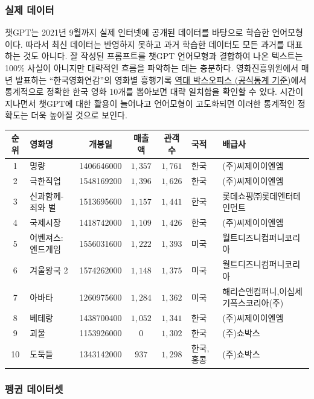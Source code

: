 \documentclass[
  letterpaper,
]{book}
\begin{document}
\hypertarget{uxc2e4uxc81c-uxb370uxc774uxd130}{%
\subsubsection{실제 데이터}\label{uxc2e4uxc81c-uxb370uxc774uxd130}}

챗GPT는 2021년 9월까지 실제 인터넷에 공개된 데이터를 바탕으로 학습한
언어모형이다. 따라서 최신 데이터는 반영하지 못하고 과거 학습한 데이터도
모든 과거를 대표하는 것도 아니다. 잘 작성된 프롬프트를 챗GPT 언어모형과
결합하여 나온 텍스트는 100\% 사실이 아니지만 대략적인 흐름을 파악하는
데는 충분하다. 영화진흥위원에서 매년 발표하는 ``한국영화연감''의 영화별
흥행기록
\href{https://www.kobis.or.kr/kobis/business/stat/offc/findFormerBoxOfficeList.do}{역대
박스오피스 (공식통계 기준)}에서 통계적으로 정확한 한국 영화 10개를
뽑아보면 대략 일치함을 확인할 수 있다. 시간이 지나면서 챗GPT에 대한
활용이 늘어나고 언어모형이 고도화되면 이러한 통계적인 정확도는 더욱
높아질 것으로 보인다.

\begin{longtable*}{clcccll}
\toprule
순위 & 영화명 & 개봉일 & 매출액 & 관객수 & 국적 & 배급사 \\ 
 & 명량 & 1406646000 & $1,357$ & $1,761$ & 한국 & (주)씨제이이엔엠 \\ 
2 & 극한직업 & 1548169200 & $1,396$ & $1,626$ & 한국 & (주)씨제이이엔엠 \\ 
3 & 신과함께-죄와 벌 & 1513695600 & $1,157$ & $1,441$ & 한국 & 롯데쇼핑㈜롯데엔터테인먼트 \\ 
4 & 국제시장 & 1418742000 & $1,109$ & $1,426$ & 한국 & (주)씨제이이엔엠 \\ 
5 & 어벤져스: 엔드게임 & 1556031600 & $1,222$ & $1,393$ & 미국 & 월트디즈니컴퍼니코리아 \\ 
6 & 겨울왕국 2 & 1574262000 & $1,148$ & $1,375$ & 미국 & 월트디즈니컴퍼니코리아 \\ 
7 & 아바타 & 1260975600 & $1,284$ & $1,362$ & 미국 & 해리슨앤컴퍼니,이십세기폭스코리아(주) \\ 
8 & 베테랑 & 1438700400 & $1,052$ & $1,341$ & 한국 & (주)씨제이이엔엠 \\ 
9 & 괴물 & 1153926000 & $0$ & $1,302$ & 한국 & (주)쇼박스 \\ 
10 & 도둑들 & 1343142000 & $937$ & $1,298$ & 한국,홍콩 & (주)쇼박스 \\ 
\bottomrule
\end{longtable*}

\hypertarget{uxd3aduxadc4-uxb370uxc774uxd130uxc14b}{%
\subsubsection{펭귄
데이터셋}\label{uxd3aduxadc4-uxb370uxc774uxd130uxc14b}}
\end{document}

